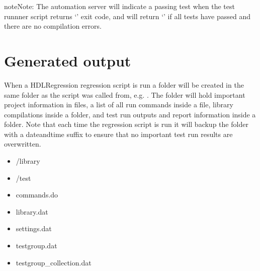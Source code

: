 \documentclass[letterpaper,10pt,english]{sphinxmanual}
\let\sphinxpxdimen\pdfpxdimen\else\newdimen\sphinxpxdimen
\begin{document}
\begin{sphinxadmonition}{note}{Note:}
\sphinxAtStartPar
The automation server will indicate a passing test when the test runnner script returns ‘’ exit code,
and  will return ‘’ if all tests have passed and there are no compilation errors.
\end{sphinxadmonition}

\sphinxAtStartPar
{}

\noindent{\hspace*{\fill}\sphinxincludegraphics[width=750\sphinxpxdimen]{{jenkins_ci}.png}\hspace*{\fill}}


\chapter{Generated output}
\label{\detokenize{output:generated-output}}\label{\detokenize{output::doc}}
\sphinxAtStartPar
When a HDLRegression regression script is run a folder  will be created in the same folder as the script was called
from, e.g. . The folder will hold important project information in  files, a list of all run commands inside
a  file, library compilations inside a  folder, and test run outputs and report information inside
a  folder. Note that each time the regression script is run it will back\sphinxhyphen{}up the  folder with a date\sphinxhyphen{}and\sphinxhyphen{}time
suffix to ensure that no important test run results are overwritten.
\begin{itemize}
\item {} 
\sphinxAtStartPar
/library

\item {} 
\sphinxAtStartPar
/test

\item {} 
\sphinxAtStartPar
commands.do

\item {} 
\sphinxAtStartPar
library.dat

\item {} 
\sphinxAtStartPar
settings.dat

\item {} 
\sphinxAtStartPar
testgroup.dat

\item {} 
\sphinxAtStartPar
testgroup\_collection.dat

\end{itemize}
\end{document}
